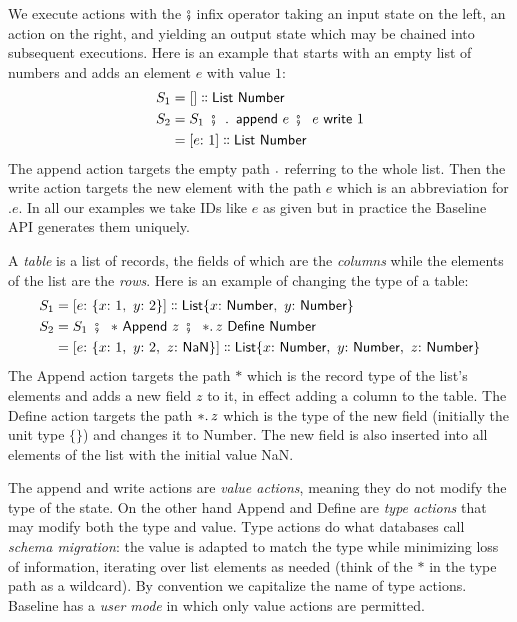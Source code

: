 \documentclass[english,submission]{programming}
\theoremstyle{definition}
\newcommand{\mathbox}[1]{\colorbox{black!10}{$#1$}}
\DeclareMathOperator{\exec}{\ \fatsemi\ \ }
\newcommand{\is}{{:}\ }
\newcommand{\comma}{,\ }
\newcommand{\isa}{\dblcolon}
\begin{document}
We execute actions with the \mathbox{\fatsemi} infix operator taking an input state on the left, an action on the right, and yielding an output state which may be chained into subsequent executions. Here is an example that starts with an empty list of numbers and adds an element $e$ with value $1$:
\begin{align*}
S_1 &= [] \isa \textsf{List Number}\\
S_2 &= S_1 \exec \ldotp \textsf{ append } e \exec e \textsf{ write } 1\\
&= [e \is 1] \isa \textsf{List Number}\\
\end{align*}
The \textsf{append} action targets the empty path \mathbox{\ldotp} referring to the whole list. Then the \textsf{write} action targets the new element with the path \mathbox{e} which is an abbreviation for \mathbox{.e}. In all our examples we take IDs like $e$ as given but in practice the Baseline API generates them uniquely.

A \textit{table} is a list of records, the fields of which are the \textit{columns} while the elements of the list are the \textit{rows}. Here is an example of changing the type of a table:
\begin{align*}
S_1 &= [e \is \{x \is 1 \comma  y \is 2\}] \isa \textsf{List} \{x \is \textsf{Number}\comma  y \is \textsf{Number}\}\\
S_2 &= S_1 \exec * \textsf{ Append } z \exec *\ldotp z \textsf{ Define Number}\\
 &= [e \is \{x \is 1\comma  y \is 2,\ z\is \textsf{NaN}\}] \isa \textsf{List} \{x \is \textsf{Number}\comma  y \is \textsf{Number}\comma z\is \textsf{Number}\}\\
\end{align*}
The \textsf{Append} action targets the path \mathbox{*} which is the record type of the list's elements and adds a new field \mathbox{z} to it, in effect adding a column to the table. The \textsf{Define} action targets the path \mathbox{*\ldotp z} which is the type of the new field (initially the unit type $\{\}$) and changes it to \textsf{Number}. The new field is also inserted into all elements of the list with the initial value \textsf{NaN}.

The \textsf{append} and \textsf{write} actions are \textit{value actions}, meaning they do not modify the type of the state. On the other hand \textsf{Append} and \textsf{Define} are \textit{type actions} that may modify both the type and value. Type actions do what databases call \textit{schema migration}: the value is adapted to match the type while minimizing loss of information, iterating over list elements as needed (think of the $*$ in the type path as a wildcard). By convention we capitalize the name of type actions. Baseline has a \textit{user mode} in which only value actions are permitted.
\end{document}
